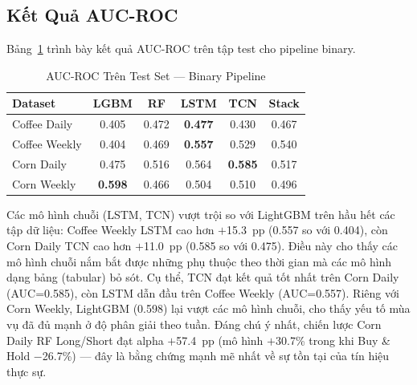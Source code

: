 \documentclass[conference]{IEEEtran}
\begin{document}
\subsection{Kết Quả AUC-ROC}
Bảng~\ref{tab:auc} trình bày kết quả AUC-ROC trên tập test cho pipeline binary.
\begin{table}[t]
\caption{AUC-ROC Trên Test Set --- Binary Pipeline}
\label{tab:auc}
\centering
\begin{tabular}{@{}lccccc@{}}
\toprule
\textbf{Dataset} & \textbf{LGBM} & \textbf{RF} & \textbf{LSTM} & \textbf{TCN} & \textbf{Stack} \\
\midrule
Coffee Daily  & 0.405 & 0.472 & \textbf{0.477} & 0.430 & 0.467 \\
Coffee Weekly & 0.404 & 0.469 & \textbf{0.557} & 0.529 & 0.540 \\
Corn Daily    & 0.475 & 0.516 & 0.564 & \textbf{0.585} & 0.517 \\
Corn Weekly   & \textbf{0.598} & 0.466 & 0.504 & 0.510 & 0.496 \\
\bottomrule
\end{tabular}
\end{table}
Các mô hình chuỗi (LSTM, TCN) vượt trội so với LightGBM trên hầu hết các tập
dữ liệu: Coffee Weekly LSTM cao hơn $+$15.3~pp (0.557 so với 0.404), còn Corn
Daily TCN cao hơn $+$11.0~pp (0.585 so với 0.475). Điều này cho thấy các mô
hình chuỗi nắm bắt được những phụ thuộc theo thời gian mà các mô hình dạng
bảng (tabular) bỏ sót. Cụ thể, TCN đạt kết quả tốt nhất trên Corn Daily
(AUC=0.585), còn LSTM dẫn đầu trên Coffee Weekly (AUC=0.557).
Riêng với Corn Weekly, LightGBM (0.598) lại vượt các mô hình chuỗi, cho thấy
yếu tố mùa vụ đã đủ mạnh ở độ phân giải theo tuần. Đáng chú ý nhất, chiến
lược Corn Daily RF Long/Short đạt alpha $+$57.4~pp (mô hình $+$30.7\% trong
khi Buy \& Hold $-$26.7\%) --- đây là bằng chứng mạnh mẽ nhất về sự tồn tại
của tín hiệu thực sự.
\end{document}
